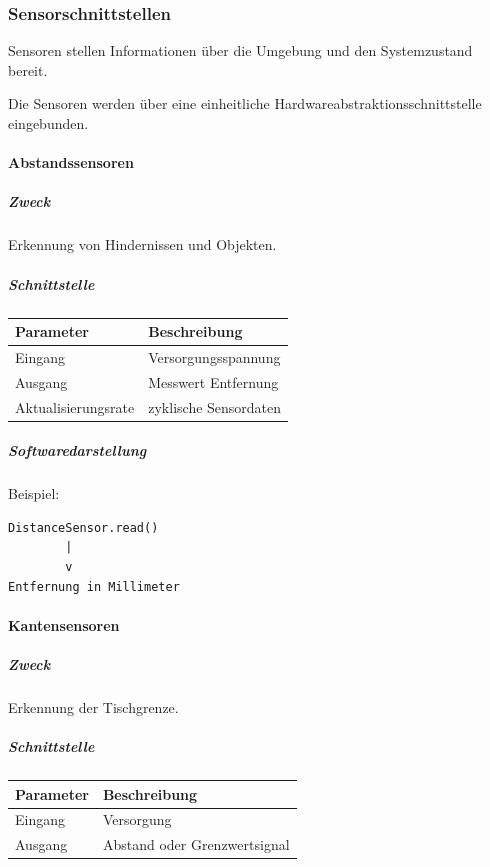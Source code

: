 \subsubsection{Sensorschnittstellen}\label{sensorschnittstellen}

Sensoren stellen Informationen über die Umgebung und den Systemzustand
bereit.

Die Sensoren werden über eine einheitliche
Hardwareabstraktionsschnittstelle eingebunden.

\paragraph{Abstandssensoren}\label{abstandssensoren-1}

\subparagraph{Zweck}\label{zweck}

Erkennung von Hindernissen und Objekten.

\subparagraph{Schnittstelle}\label{schnittstelle}

\begin{longtable}[]{@{}ll@{}}
\toprule\noalign{}
Parameter & Beschreibung \\
\midrule\noalign{}
\endhead
\bottomrule\noalign{}
\endlastfoot
Eingang & Versorgungsspannung \\
Ausgang & Messwert Entfernung \\
Aktualisierungsrate & zyklische Sensordaten \\
\end{longtable}

\subparagraph{Softwaredarstellung}\label{softwaredarstellung}

Beispiel:

\begin{verbatim}
DistanceSensor.read()
        |
        v
Entfernung in Millimeter
\end{verbatim}

\paragraph{Kantensensoren}\label{kantensensoren}

\subparagraph{Zweck}\label{zweck-1}

Erkennung der Tischgrenze.

\subparagraph{Schnittstelle}\label{schnittstelle-1}

\begin{longtable}[]{@{}ll@{}}
\toprule\noalign{}
Parameter & Beschreibung \\
\midrule\noalign{}
\endhead
\bottomrule\noalign{}
\endlastfoot
Eingang & Versorgung \\
Ausgang & Abstand oder Grenzwertsignal \\
\end{longtable}

